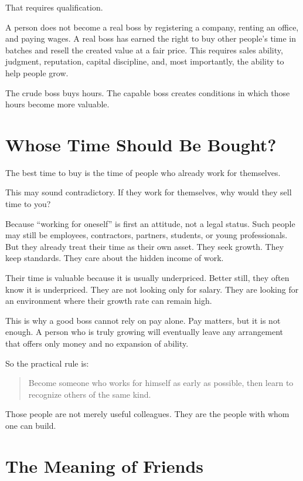 That requires qualification.

A person does not become a real boss by registering a company, renting an office, and paying wages. A real boss has earned the right to buy other people's time in batches and resell the created value at a fair price. This requires sales ability, judgment, reputation, capital discipline, and, most importantly, the ability to help people grow.

The crude boss buys hours. The capable boss creates conditions in which those hours become more valuable.

\section*{Whose Time Should Be Bought?}

The best time to buy is the time of people who already work for themselves.

This may sound contradictory. If they work for themselves, why would they sell time to you?

Because ``working for oneself'' is first an attitude, not a legal status. Such people may still be employees, contractors, partners, students, or young professionals. But they already treat their time as their own asset. They seek growth. They keep standards. They care about the hidden income of work.

Their time is valuable because it is usually underpriced. Better still, they often know it is underpriced. They are not looking only for salary. They are looking for an environment where their growth rate can remain high.

This is why a good boss cannot rely on pay alone. Pay matters, but it is not enough. A person who is truly growing will eventually leave any arrangement that offers only money and no expansion of ability.

So the practical rule is:

\begin{quote}
Become someone who works for himself as early as possible, then learn to recognize others of the same kind.
\end{quote}

Those people are not merely useful colleagues. They are the people with whom one can build.

\section*{The Meaning of Friends}

